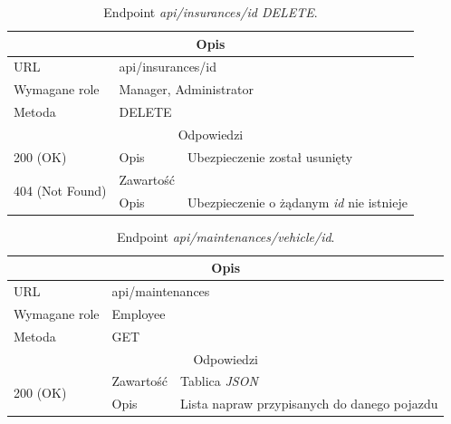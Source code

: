 \documentclass[eng,printmode,openany]{mgr}
\begin{document}
	\begin{table}[H]
		\caption{Endpoint \textit{api/insurances/id DELETE}.}
		\begin{tabularx}{\textwidth}{|l|l|X|}
			\hline
			\multicolumn{3}{|c|}{Opis}
			\\ \hline
			URL                       & \multicolumn{2}{l|}{api/insurances/id}
			\\ \hline
			Wymagane role             & \multicolumn{2}{l|}{Manager, Administrator}
			\\ \hline
			Metoda                    & \multicolumn{2}{l|}{DELETE}
			\\ \hline
			\multicolumn{3}{|c|}{Odpowiedzi}
			\\ \hline
			200 (OK)			                & Opis         	& Ubezpieczenie został usunięty
			\\ \hline
			\multirow{2}{*}{404 (Not Found)} 	& Zawartość     & 
			\\ \cline{2-3}                      & Opis          & Ubezpieczenie o żądanym \textit{id} nie istnieje
			\\ \hline
		\end{tabularx}
	\end{table}
	
	\begin{table}[H]
		\caption{Endpoint \textit{api/maintenances/vehicle/id}.}
		\begin{tabularx}{\textwidth}{|l|l|X|}
			\hline
			\multicolumn{3}{|c|}{Opis}
			\\ \hline
			URL                         & \multicolumn{2}{l|}{api/maintenances}
			\\ \hline
			Wymagane role               & \multicolumn{2}{l|}{Employee}
			\\ \hline
			Metoda                      & \multicolumn{2}{l|}{GET}
			\\ \hline
			\multicolumn{3}{|c|}{ Odpowiedzi}
			\\ \hline
			\multirow{2}{*}{200 (OK)}   & Zawartość         & Tablica \textit{JSON}
			\\ \cline{2-3}              & Opis         	    & Lista napraw przypisanych do danego pojazdu
			\\ \hline
		\end{tabularx}
	\end{table}
	
\end{document}
